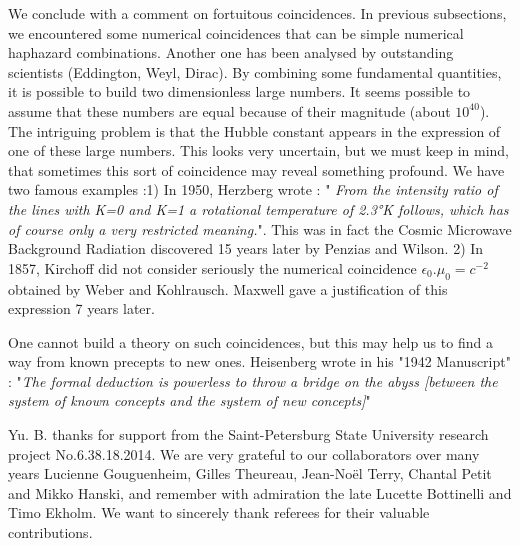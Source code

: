 \medskip
We conclude with a comment on fortuitous coincidences. In previous subsections, we encountered some numerical coincidences that can be simple numerical haphazard combinations. Another one has been analysed by outstanding scientists (Eddington, Weyl, Dirac). By combining some fundamental quantities, it is possible to build two dimensionless large numbers. It seems possible to assume that these numbers are equal because of their magnitude (about $10^{40}$). The intriguing problem is that the Hubble constant appears in the expression of one of these large numbers.  This looks very uncertain, but we must keep in mind, that sometimes this sort of coincidence may reveal something profound. We have two famous examples :1) In 1950, Herzberg wrote : " {\it {From the intensity ratio of the lines with K=0 and K=1 a rotational temperature of 2.3°K follows, which has of course only a very restricted meaning.}}". This was in fact the Cosmic Microwave Background Radiation discovered 15 years later by Penzias and Wilson.   2) In 1857, Kirchoff did not consider seriously the numerical coincidence $\epsilon_0.\mu_0 =c^{-2}$  obtained by Weber and Kohlrausch. Maxwell gave a justification of this expression 7 years later.

One cannot build a theory on such coincidences, but this may help us to find a way from known precepts to new ones. Heisenberg wrote in his "1942 Manuscript" : "{\it {The formal deduction is powerless to throw a bridge on the abyss [between the system of known concepts and the system of new concepts]}}"

\begin{acknowledgements}
Yu. B. thanks for support from the Saint-Petersburg State University research project No.6.38.18.2014. We are very grateful to our collaborators over many years Lucienne Gouguenheim, Gilles Theureau, Jean-No{\"{e}}l Terry, Chantal Petit and Mikko Hanski, and remember with admiration the late Lucette Bottinelli and Timo Ekholm. We want to sincerely thank referees for their valuable contributions.
\end{acknowledgements}






